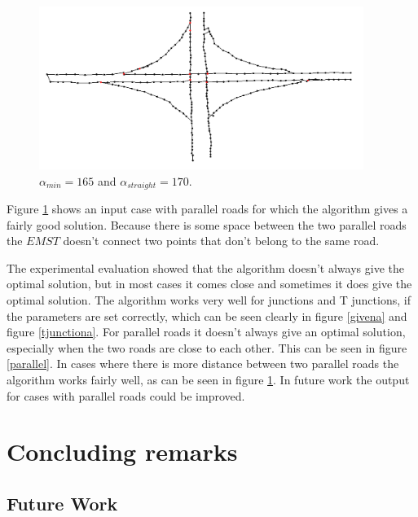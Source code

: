 \documentclass[11pt]{article}
\begin{document}
\begin{figure}[h]
  \centering
  \graphicspath{ {images/}}
  \includegraphics[width=\linewidth, height=150pt]{knooppunt167_170}
  \caption{$\alpha_{min}=165$ and $\alpha_{straight}=170$.}
  \label{knooppunt}
\end{figure}

Figure \ref{knooppunt} shows an input case with parallel roads for which the algorithm gives a fairly good solution. Because there is some space between the two parallel roads the $EMST$ doesn't connect two points that don't belong to the same road.

The experimental evaluation showed that the algorithm doesn't always give the optimal solution, but in most cases it comes close and sometimes it does give the optimal solution. The algorithm works very well for junctions and T junctions, if the parameters are set correctly, which can be seen clearly in figure \ref{givena} and figure \ref{tjunctiona}. For parallel roads it doesn't always give an optimal solution, especially when the two roads are close to each other. This can be seen in figure \ref{parallel}. In cases where there is more distance between two parallel roads the algorithm works fairly well, as can be seen in figure \ref{knooppunt}. In future work the output for cases with parallel roads could be improved.


\section{Concluding remarks}



\subsection{Future Work}

\end{document}
